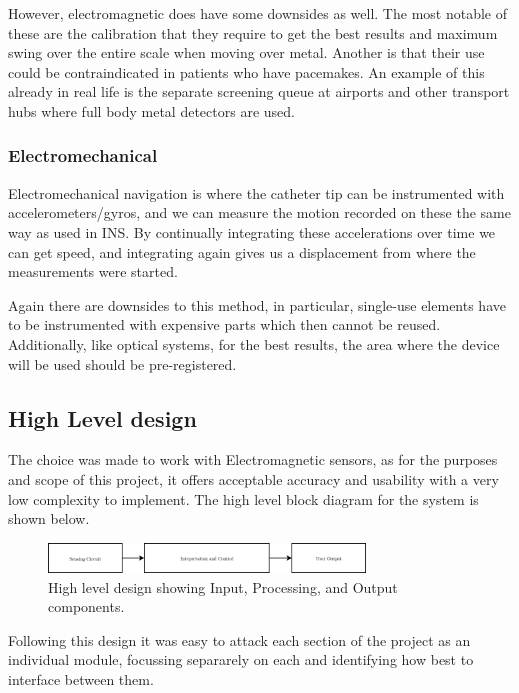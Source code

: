 \documentclass[a4paper]{article}
\begin{document}
            However, electromagnetic does have some downsides as well. The most notable of these are the calibration that they require to get the best results and maximum swing over the entire scale when moving over metal. Another is that their use could be contraindicated in patients who have pacemakes. An example of this already in real life is the separate screening queue at airports and other transport hubs where full body metal detectors are used.

            \subsubsection{Electromechanical}
            Electromechanical navigation is where the catheter tip can be instrumented with accelerometers/gyros, and we can measure the motion recorded on these the same way as used in INS. By continually integrating these accelerations over time we can get speed, and integrating again gives us a displacement from where the measurements were started.

            Again there are downsides to this method, in particular, single-use elements have to be instrumented with expensive parts which then cannot be reused. Additionally, like optical systems, for the best results, the area where the device will be used should be pre-registered.

        \subsection{High Level design}
        The choice was made to work with Electromagnetic sensors, as for the purposes and scope of this project, it offers acceptable accuracy and usability with a very low complexity to implement. The high level block diagram for the system is shown below.
        \begin{figure}[h]
            \centering
            \includegraphics[width=0.75\textwidth]{images/highlevel}
            \caption{High level design showing Input, Processing, and Output components.}
        \end{figure}

        Following this design it was easy to attack each section of the project as an individual module, focussing separarely on each and identifying how best to interface between them.
\end{document}
